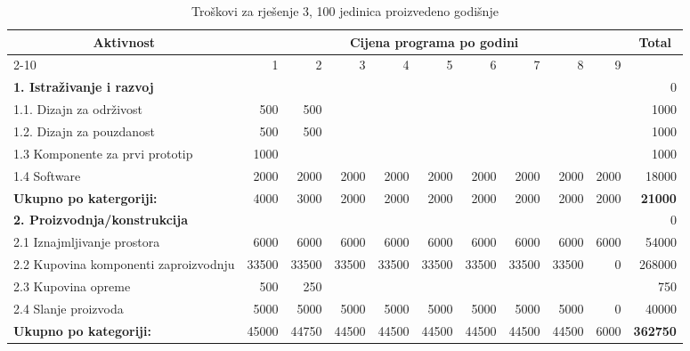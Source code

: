 \documentclass[12pt]{article}
\begin{document}
\begin{landscape}
\begin{table}[htbp]
  \centering
  \small
  \caption{Troškovi za rješenje 3, 100 jedinica proizvedeno godišnje}
    \begin{tabular}{lrrrrrrrrrr}
    \toprule
    \multicolumn{1}{c}{\multirow{2}[4]{*}{Aktivnost}} & \multicolumn{9}{c}{Cijena programa po godini}                         & \multicolumn{1}{c}{\multirow{2}[4]{*}{Total}} \\
\cmidrule{2-10}          & 1     & 2     & 3     & 4     & 5     & 6     & 7     & 8     & 9     &  \\
    \midrule
\textbf{1. Istraživanje i razvoj} &       &       &       &       &       &       &       &       &       & 0 \\
    1.1. Dizajn za održivost & 500   & 500   &       &       &       &       &       &       &       & 1000 \\
    1.2. Dizajn za pouzdanost & 500   & 500   &       &       &       &       &       &       &       & 1000 \\
    1.3 Komponente za prvi prototip & 1000  &       &       &       &       &       &       &       &       & 1000 \\
    1.4 Software & 2000  & 2000  & 2000  & 2000  & 2000  & 2000  & 2000  & 2000  & 2000  & 18000 \\
    \midrule
    \textbf{Ukupno po katergoriji:} & 4000  & 3000  & 2000  & 2000  & 2000  & 2000  & 2000  & 2000  & 2000  & \textbf{21000} \\
    \midrule
    \textbf{2. Proizvodnja/konstrukcija} &       &       &       &       &       &       &       &       &       & 0 \\
    2.1 Iznajmljivanje prostora & 6000  & 6000  & 6000  & 6000  & 6000  & 6000  & 6000  & 6000  & 6000  & 54000 \\
    \multicolumn{1}{p{14.715em}}{2.2 Kupovina komponenti za\newline{}proizvodnju} & 33500 & 33500 & 33500 & 33500 & 33500 & 33500 & 33500 & 33500 & 0     & 268000 \\
    2.3 Kupovina opreme & 500   & 250   &       &       &       &       &       &       &       & 750 \\
    2.4 Slanje proizvoda & 5000  & 5000  & 5000  & 5000  & 5000  & 5000  & 5000  & 5000  & 0     & 40000 \\
    \midrule
    \textbf{Ukupno po kategoriji:} & 45000 & 44750 & 44500 & 44500 & 44500 & 44500 & 44500 & 44500 & 6000  & \textbf{362750} \\

\end{tabular}
\end{table}
\end{landscape}
\end{document}
